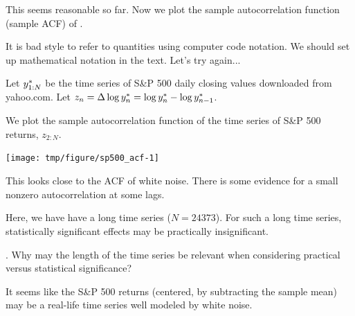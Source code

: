 \begin{frame}[fragile]


\bi
\item This seems reasonable so far. Now we plot the sample autocorrelation function (sample ACF) of . 

\item It is bad style to refer to quantities using computer code notation. We should set up mathematical notation in the text. Let's try again...

\item Let $y_{1:N}^*$ be the time series of S\&P 500 daily closing values downloaded from yahoo.com.  Let $z_n= \Delta \log y_n^* = \log y_{n}^*-\log y_{n-1}^*$. 

\item We plot the sample autocorrelation function of the time series of S\&P 500 returns, ${z_{2:N}}$.
\begin{knitrout}\small
{}\color{fgcolor}\begin{kframe}
\begin{alltt}
 \hlkwb{<-} \hldef{(}
\end{alltt}
\end{kframe}
\end{knitrout}
\ei
\vspace{-1mm}

\begin{knitrout}\small
{}\color{fgcolor}

{\centering \texttt{[image: tmp/figure/sp500\_acf-1]} 

}


\end{knitrout}

\end{frame}

\begin{frame}[fragile]
\bi
\item This looks close to the ACF of white noise. There is some evidence for a small nonzero autocorrelation at some lags. 

\item Here, we have have a long time series ($N=24373$). For such a long time series, statistically significant effects may be practically insignificant. 
 
\ei

\myquestion. Why may the length of the time series be relevant when considering practical versus statistical significance? 


\bi
\item It seems like the S\&P 500 returns (centered, by subtracting the sample mean) may be a real-life time series well modeled by white noise.
\ei

\end{frame} 


